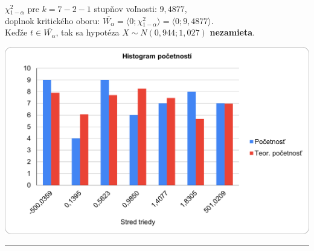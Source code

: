\documentclass[pdftex, 11pt, a4paper, titlepage]{article}
\begin{document}
    \noindent
    $ \chi{}_{1-\alpha}^2 $ pre $ k = 7-2-1 $ stupňov voľnosti: $ 9,4877 $,\\

    \noindent
    doplnok kritického oboru: $ \overline{W_\alpha} = \langle 0;\chi{}_{1-\alpha}^2 \rangle = \langle 0;9,4877 \rangle $.\\

    \noindent
    Keďže $ t \in \overline{W_\alpha} $, tak sa hypotéza $ X \sim N(0,944; 1,027) $ \textbf{nezamieta}.

    \includegraphics[scale=0.8]{histogram_pocetnosti.png}

    \noindent\rule{\linewidth}{0.4pt}\\
\end{document}
